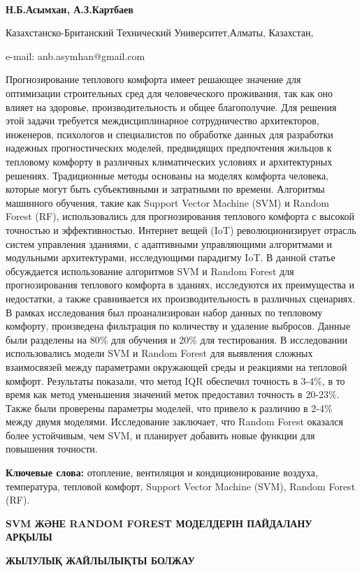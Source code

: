 {\bfseries Н.Б.Асымхан\textsuperscript{\envelope }, А.З.Картбаев}

Казахстанско-Британский Технический Университет,Алматы, Казахстан,

e-mail: anb.asymhan@gmail.com

Прогнозирование теплового комфорта имеет решающее значение для
оптимизации строительных сред для человеческого проживания, так как оно
влияет на здоровье, производительность и общее благополучие. Для решения
этой задачи требуется междисциплинарное сотрудничество архитекторов,
инженеров, психологов и специалистов по обработке данных для разработки
надежных прогностических моделей, предвидящих предпочтения жильцов к
тепловому комфорту в различных климатических условиях и архитектурных
решениях. Традиционные методы основаны на моделях комфорта человека,
которые могут быть субъективными и затратными по времени. Алгоритмы
машинного обучения, такие как Support Vector Machine (SVM) и Random
Forest (RF), использовались для прогнозирования теплового комфорта с
высокой точностью и эффективностью. Интернет вещей (IoT)
революционизирует отрасль систем управления зданиями, с адаптивными
управляющими алгоритмами и модульными архитектурами, исследующими
парадигму IoT. В данной статье обсуждается использование алгоритмов SVM
и Random Forest для прогнозирования теплового комфорта в зданиях,
исследуются их преимущества и недостатки, а также сравнивается их
производительность в различных сценариях. В рамках исследования был
проанализирован набор данных по тепловому комфорту, произведена
фильтрация по количеству и удаление выбросов. Данные были разделены на
80\% для обучения и 20\% для тестирования. В исследовании использовались
модели SVM и Random Forest для выявления сложных взаимосвязей между
параметрами окружающей среды и реакциями на тепловой комфорт. Результаты
показали, что метод IQR обеспечил точность в 3-4\%, в то время как метод
уменьшения значений меток предоставил точность в 20-23\%. Также были
проверены параметры моделей, что привело к различию в 2-4\% между двумя
моделями. Исследование заключает, что Random Forest оказался более
устойчивым, чем SVM, и планирует добавить новые функции для повышения
точности.

{\bfseries Ключевые слова:} отопление, вентиляция и кондиционирование
воздуха, температура, тепловой комфорт, Support Vector Machine (SVM),
Random Forest (RF).

{\bfseries SVM ЖӘНЕ RANDOM FOREST МОДЕЛДЕРІН ПАЙДАЛАНУ АРҚЫЛЫ}

{\bfseries ЖЫЛУЛЫҚ ЖАЙЛЫЛЫҚТЫ БОЛЖАУ}

